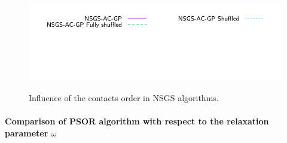 \documentclass[a4paper]{article}
\begin{document}
\begin{figure}
{\includegraphics[height=\legendheight]{../figure/NSGS/Shuffled/1.0e-08/50/time/profile-Chain_legend.pdf}} 
\caption{Influence of the contacts order in NSGS algorithms.}
\label{fig:NSGS/Shuffled}
\end{figure}
\paragraph{Comparison of PSOR algorithm with respect to  the relaxation parameter $\omega$}
\end{document}
